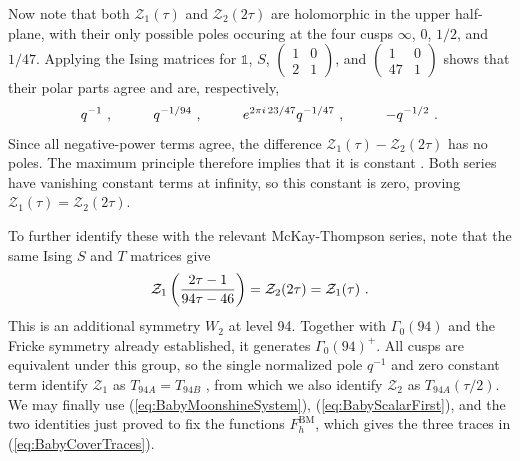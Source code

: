 \documentclass[12pt]{article}
\numberwithin{equation}{section}
\newcommand{\bea}{\begin{eqnarray}}
\newcommand{\eea}{\end{eqnarray}}
\def\cZ{\mathcal{Z}}
\theoremstyle{remark}
\begin{document}
Now note that both $\mathcal Z_1(\tau)$ and $\mathcal Z_2(2\tau)$ are holomorphic in the upper half-plane, with their only possible poles occuring at the four cusps $\infty$, $0$, $1/2$, and $1/47$. Applying the Ising matrices for $\mathds{1}$, $S$, $\left(\begin{smallmatrix}1&0\\2&1\end{smallmatrix}\right)$, and $\left(\begin{smallmatrix}1&0\\47&1\end{smallmatrix}\right)$ shows that their polar parts agree and are, respectively,
\bea
q^{-1}~,
\hspace{0.4 in}q^{-1/94}~,
\hspace{0.4 in}e^{2\pi i\,23/47}q^{-1/47}~,
\hspace{0.4 in}-q^{-1/2}~.
\eea
Since all negative-power terms agree, the difference $\mathcal Z_1(\tau)-\mathcal Z_2(2\tau)$ has no poles. The maximum principle therefore implies that it is constant \cite{DHoker:2024xor}. Both series have vanishing constant terms at infinity, so this constant is zero, proving $\mathcal Z_1(\tau)=\mathcal Z_2(2\tau)$.

To further identify these with the relevant McKay-Thompson series, note that the same Ising $S$ and $T$ matrices give
\bea
\cZ_{1}\left({2\tau-1\over94\tau-46}\right)=\cZ_{2}(2\tau)=\cZ_{1}(\tau)~.
\eea
This is an additional symmetry $W_2$ at level 94. Together with $\Gamma_0(94)$ and the Fricke symmetry already established, it generates $\Gamma_0(94)^+$. All cusps are equivalent under this group, so the single normalized pole $q^{-1}$ and zero constant term identify $\cZ_{1}$ as $T_{94A}=T_{94B}$ \cite{Conway:1979qga}, from which we also identify $\cZ_2$ as  $T_{94A}(\tau/2)$. 
We may finally use (\ref{eq:BabyMoonshineSystem}), (\ref{eq:BabyScalarFirst}), and the two identities just proved to fix the functions $F^{\mathrm{BM}}_h$, which gives the three traces in (\ref{eq:BabyCoverTraces}).




\end{document}

